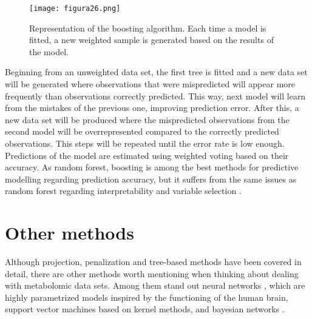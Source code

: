 \begin{figure}[hbtp]
\centering
\texttt{[image: figura26.png]}
\caption{Representation of the boosting algorithm. Each time a model is fitted, a new weighted sample is generated based on the results of the model.}
\label{figura26}
\end{figure}

Beginning from an unweighted data set, the first tree is fitted and a new data set will be generated where observations that were mispredicted will appear more frequently than observations correctly predicted. This way, next model will learn from the mistakes of the previous one, improving prediction error. After this, a new data set will be produced where the mispredicted observations from the second model will be overrepresented compared to the correctly predicted observations. This steps will be repeated until the error rate is low enough. Predictions of the model are estimated using weighted voting based on their accuracy. As random forest, boosting is among the best methods for predictive modelling regarding prediction accuracy, but it suffers from the same issues as random forest regarding interpretability and variable selection \parencite{auret2011empirical}.

\section{Other methods}
Although projection, penalization and tree-based methods have been covered in detail, there are other methods worth mentioning when thinking about dealing with metabolomic data sets. Among them stand out neural networks \parencite{dayhoff2001artificial}, which are highly parametrized models inspired by the functioning of the human brain, support vector machines \parencite{mahadevan2008analysis} based on kernel methods, and bayesian networks \parencite{bartel2013statistical}.
